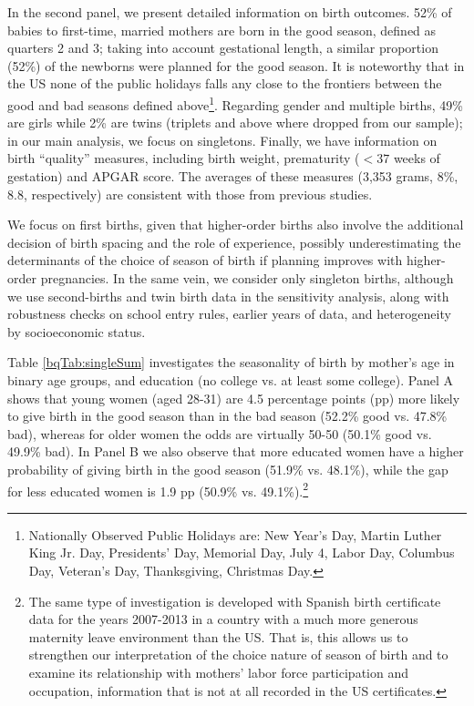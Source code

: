 \documentclass[a4paper, 12 pt]{article}
\theoremstyle{plain}
\begin{document}
\begin{doublespace}
In the second panel, we present detailed information on birth outcomes. 52\% of babies to first-time, married mothers are born in the good season, defined as quarters 2 and 3; taking into account gestational length, a similar proportion (52\%) of the newborns were planned for the good season. It is noteworthy that in the US none of the public holidays falls any close to the frontiers between the good and bad seasons defined above\footnote{Nationally Observed Public Holidays are: New Year's Day, Martin Luther King Jr. Day, Presidents' Day, Memorial Day, July 4, Labor Day, Columbus Day, Veteran's Day, Thanksgiving, Christmas Day.}. Regarding gender and multiple births, 49\% are girls while 2\% are twins (triplets and above where dropped from our sample); in our main analysis, we focus on singletons. Finally, we have information on birth ``quality'' measures, including birth weight, prematurity ($<37$ weeks of gestation) and APGAR score. The averages of these measures (3,353 grams, 8\%, 8.8, respectively) are consistent with those from previous studies.

We focus on first births, given that higher-order births also involve the additional decision of birth spacing and the role of experience, possibly underestimating the determinants of the choice of season of birth if planning improves with higher-order pregnancies. In the same vein, we consider only singleton births, although we use second-births and twin birth data in the sensitivity analysis, along with robustness checks on school entry rules, earlier years of data, and heterogeneity by socioeconomic status.

Table \ref{bqTab:singleSum} investigates the seasonality of birth by mother's age in binary age groups, and education (no college vs. at least some college). Panel A shows that young women (aged 28-31) are 4.5 percentage points (pp) more likely to give birth in the good season than in the bad season (52.2\% good vs. 47.8\% bad), whereas for older women the odds are virtually 50-50 (50.1\% good vs. 49.9\% bad). In Panel B we also observe that more educated women have a higher probability of giving birth in the good season (51.9\% vs. 48.1\%), while the gap for less educated women is 1.9 pp (50.9\% vs. 49.1\%).\footnote{The same type of investigation is developed with Spanish birth certificate data for the years 2007-2013 in a country with a much more generous maternity leave environment than the US. That is, this allows us to strengthen our interpretation of the choice nature of season of birth and to examine its relationship with mothers' labor force participation and occupation, information that is not at all recorded in the US certificates.}


\end{doublespace}
\end{document}
